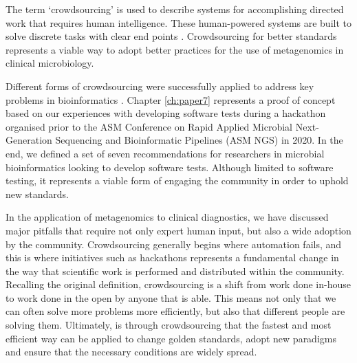 The term ‘crowdsourcing’ is used to describe systems for accomplishing directed work that requires human intelligence. These human-powered systems are built to solve discrete tasks with clear end points \citep{good_crowdsourcing_2013}. Crowdsourcing for better standards represents a viable way to adopt better practices for the use of metagenomics in clinical microbiology.

Different forms of crowdsourcing were successfully applied to address key problems in bioinformatics \citep{good_crowdsourcing_2013, connor_ncbis_2019, powell_organizing_2021}. Chapter \ref{ch:paper7} represents a proof of concept based on our experiences with developing software tests during a hackathon organised prior to the ASM Conference on Rapid Applied Microbial Next-Generation Sequencing and Bioinformatic Pipelines (ASM NGS) in 2020. In the end, we defined a set of
seven recommendations for researchers in microbial bioinformatics looking to develop software tests. Although limited to software testing, it represents a viable form of engaging the community in order to uphold new standards.

In the application of metagenomics to clinical diagnostics, we have discussed major pitfalls that require not only expert human input, but also a wide adoption by the community. Crowdsourcing generally begins where automation fails, and this is where initiatives such as hackathons represents a fundamental change in the way that scientific work is performed and distributed within the community. Recalling the original definition, crowdsourcing is a shift from work done in-house to work done in the open by anyone that is able. This means not only that we can often solve more problems more efficiently, but also that different people are solving them. Ultimately, is through crowdsourcing that the fastest and most efficient way can be applied to change golden standards, adopt new paradigms and ensure that the necessary conditions are widely spread. 


